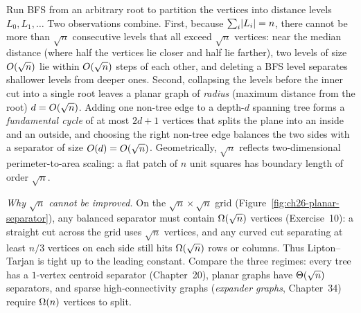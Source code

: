 \begin{intuitionbox}
Run BFS from an arbitrary root to partition the vertices into distance levels
$L_0,L_1,\dots$ Two observations combine. First, because $\sum_i \lvert L_i\rvert=n$, there cannot
be more than $\sqrt{n}$ consecutive levels that all exceed $\sqrt{n}$ vertices: near the
median distance (where half the vertices lie closer and half lie farther), two levels of
size $O(\sqrt n)$ lie within $O(\sqrt n)$ steps of each other, and deleting a BFS level
separates shallower levels from deeper ones. Second, collapsing the levels before the inner
cut into a single root leaves a planar graph of \emph{radius} (maximum distance from the
root) $d = O(\sqrt n)$. Adding one non-tree edge to a depth-$d$ spanning tree forms a
\emph{fundamental cycle} of at most $2d + 1$ vertices that splits the plane into an inside
and an outside, and choosing the right non-tree edge balances the two sides with a separator
of size $O(d) = O(\sqrt n)$. Geometrically, $\sqrt{n}$ reflects two-dimensional
perimeter-to-area scaling: a flat patch of $n$ unit squares has boundary length of order
$\sqrt{n}$.
\end{intuitionbox}

\begin{whybox}
\emph{Why $\sqrt n$ cannot be improved.} On the $\sqrt n\times\sqrt n$ grid
(Figure~\ref{fig:ch26-planar-separator}), any balanced separator must contain $\Omega(\sqrt n)$
vertices (Exercise~10): a straight cut across the grid uses $\sqrt{n}$ vertices, and any
curved cut separating at least $n/3$ vertices on each side still hits $\Omega(\sqrt n)$ rows or
columns. Thus Lipton--Tarjan is tight up to the leading constant. Compare the three regimes:
every tree has a $1$-vertex centroid separator (Chapter~20), planar graphs have
$\Theta(\sqrt n)$ separators, and sparse high-connectivity graphs (\emph{expander graphs},
Chapter~34) require $\Omega(n)$ vertices to split.
\end{whybox}


